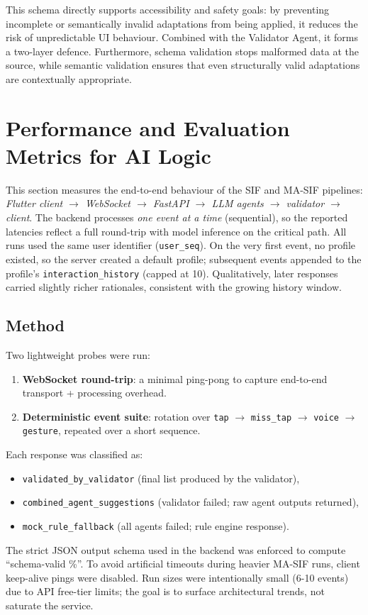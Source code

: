\documentclass[openany]{book}
\begin{document}
This schema directly supports accessibility and safety goals: by preventing incomplete or semantically invalid adaptations from being applied, it reduces the risk of unpredictable UI behaviour. Combined with the Validator Agent, it forms a two-layer defence. Furthermore, schema validation stops malformed data at the source, while semantic validation ensures that even structurally valid adaptations are contextually appropriate.

\section{Performance and Evaluation Metrics for AI Logic}
\label{sec:perf-metrics-ai-logic}

This section measures the end-to-end behaviour of the SIF and MA\mbox{-}SIF pipelines:
\emph{Flutter client $\rightarrow$ WebSocket $\rightarrow$ FastAPI $\rightarrow$ LLM agents $\rightarrow$ validator $\rightarrow$ client}.
The backend processes \emph{one event at a time} (sequential), so the reported latencies reflect a full round-trip with model inference on the critical path.  
All runs used the same user identifier (\texttt{user\_seq}). On the very first event, no profile existed, so the server created a default profile; subsequent events appended to the profile’s \texttt{interaction\_history} (capped at 10). Qualitatively, later responses carried slightly richer rationales, consistent with the growing history window.

\subsection*{Method}
Two lightweight probes were run:
\begin{enumerate}
    \item \textbf{WebSocket round-trip}: a minimal ping-pong to capture end-to-end transport + processing overhead.
    \item \textbf{Deterministic event suite}: rotation over \texttt{tap} $\rightarrow$ \texttt{miss\_tap} $\rightarrow$ \texttt{voice} $\rightarrow$ \texttt{gesture}, repeated over a short sequence.
\end{enumerate}
Each response was classified as:
\begin{itemize}
    \item \texttt{validated\_by\_validator} (final list produced by the validator),
    \item \texttt{combined\_agent\_suggestions} (validator failed; raw agent outputs returned),
    \item \texttt{mock\_rule\_fallback} (all agents failed; rule engine response).
\end{itemize}
The strict JSON output schema used in the backend was enforced to compute “schema-valid \%”. To avoid artificial timeouts during heavier MA-SIF runs, client keep-alive pings were disabled. Run sizes were intentionally small (6-10 events) due to API free-tier limits; the goal is to surface architectural trends, not saturate the service.
\end{document}
